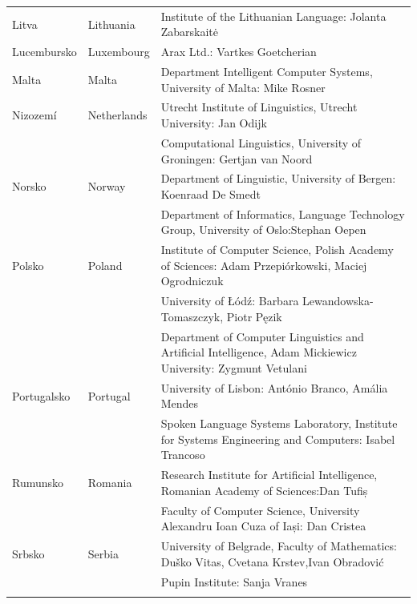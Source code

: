 \begin{longtable}{@{}llp{113mm}@{}}
  Litva & \textcolor{grey1}{Lithuania} & Institute of the Lithuanian Language: Jolanta Zabarskaitė\\ \addlinespace
  Lucembursko & \textcolor{grey1}{Luxembourg} & Arax Ltd.: Vartkes Goetcherian\\ \addlinespace
  Malta & \textcolor{grey1}{Malta} & Department Intelligent Computer Systems, University of Malta: Mike Rosner\\ \addlinespace
  Nizozemí & \textcolor{grey1}{Netherlands} & Utrecht Institute of Linguistics, Utrecht University: Jan Odijk\\ \addlinespace 
  & & Computational Linguistics, University of Groningen: Gertjan van Noord\\ \addlinespace
  Norsko & \textcolor{grey1}{Norway} & Department of Linguistic, University of Bergen: Koenraad De Smedt\\ \addlinespace 
  & & Department of Informatics, Language Technology Group, University of Oslo:\newline Stephan Oepen \\ \addlinespace
  Polsko & \textcolor{grey1}{Poland} & Institute of Computer Science, Polish Academy of Sciences: Adam Przepiórkowski, Maciej Ogrodniczuk \\ \addlinespace
  & & University of Łódź: Barbara Lewandowska-Tomaszczyk, Piotr Pęzik\\ \addlinespace
  & & Department of Computer Linguistics and Artificial Intelligence, Adam Mickiewicz University: Zygmunt Vetulani \\ \addlinespace
  Portugalsko & \textcolor{grey1}{Portugal} & University of Lisbon: António Branco, Amália Mendes \\ \addlinespace
  & & Spoken Language Systems Laboratory, Institute for Systems Engineering and Computers: Isabel Trancoso \\ \addlinespace
  Rumunsko & \textcolor{grey1}{Romania} & Research Institute for Artificial Intelligence, Romanian Academy of Sciences:\newline Dan Tufiș \\ \addlinespace
  & & Faculty of Computer Science, University Alexandru Ioan Cuza of Iași: Dan Cristea \\ \addlinespace
  Srbsko & \textcolor{grey1}{Serbia} & University of Belgrade, Faculty of Mathematics: Duško Vitas, Cvetana Krstev,\newline Ivan Obradović \\ \addlinespace
  & & Pupin Institute: Sanja Vranes \\ \addlinespace

\end{longtable}
